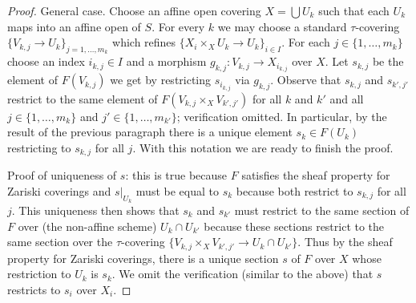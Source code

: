 \begin{proof}
\medskip\noindent
General case. Choose an affine open covering $X = \bigcup U_k$ such that
each $U_k$ maps into an affine open of $S$. For every $k$ we may choose
a standard $\tau$-covering $\{V_{k, j} \to U_k\}_{j = 1, \ldots, m_k}$
which refines $\{X_i \times_X U_k \to U_k\}_{i \in I}$. For each
$j \in \{1, \ldots, m_k\}$ choose an index $i_{k, j} \in I$
and a morphism $g_{k, j} : V_{k, j} \to X_{i_{k, j}}$ over $X$.
Let $s_{k, j}$ be the element of $F(V_{k, j})$ we get by restricting
$s_{i_{k, j}}$ via $g_{k, j}$. Observe that $s_{k, j}$ and $s_{k', j'}$
restrict to the same element of $F(V_{k, j} \times_X V_{k', j'})$
for all $k$ and $k'$ and all $j \in \{1, \ldots, m_k\}$
and $j' \in \{1, \ldots, m_{k'}\}$; verification omitted.
In particular, by the result of the previous paragraph there is a unique
element $s_k \in F(U_k)$ restricting to $s_{k, j}$ for all $j$.
With this notation we are ready to finish the proof.

\medskip\noindent
Proof of uniqueness of $s$: this is true because $F$ satisfies
the sheaf property for Zariski coverings and $s|_{U_k}$ must be equal
to $s_k$ because both restrict to $s_{k, j}$ for all $j$.
This uniqueness then shows that $s_k$ and $s_{k'}$ must restrict
to the same section of $F$ over (the non-affine scheme) $U_k \cap U_{k'}$
because these sections restrict to the same section over the
$\tau$-covering $\{V_{k, j} \times_X V_{k', j'} \to U_k \cap U_{k'}\}$.
Thus by the sheaf property for Zariski coverings, there is a unique
section $s$ of $F$ over $X$ whose restriction to $U_k$ is $s_k$.
We omit the verification (similar to the above) that $s$ restricts
to $s_i$ over $X_i$.
\end{proof}














